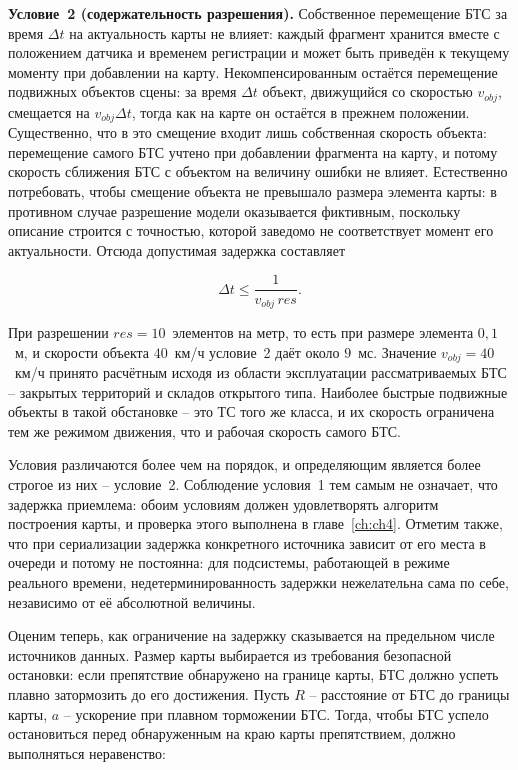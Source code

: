 \textbf{Условие~2 (содержательность разрешения).} Собственное перемещение БТС за время $\Delta t$ на актуальность карты не влияет: каждый фрагмент хранится вместе с положением датчика и временем регистрации и может быть приведён к текущему моменту при добавлении на карту. Некомпенсированным остаётся перемещение подвижных объектов сцены: за время $\Delta t$ объект, движущийся со скоростью $v_{obj}$, смещается на $v_{obj}\Delta t$, тогда как на карте он остаётся в прежнем положении. Существенно, что в это смещение входит лишь собственная скорость объекта: перемещение самого БТС учтено при добавлении фрагмента на карту, и потому скорость сближения БТС с объектом на величину ошибки не влияет. Естественно потребовать, чтобы смещение объекта не превышало размера элемента карты: в противном случае разрешение модели оказывается фиктивным, поскольку описание строится с точностью, которой заведомо не соответствует момент его актуальности. Отсюда допустимая задержка составляет

\begin{equation}
	\Delta t \le \frac{1}{v_{obj}\,res}.
	\label{eq:dt_limit}
\end{equation}

При разрешении $res = 10$~элементов на метр, то есть при размере элемента $0,1$~м, и скорости объекта $40$~км/ч условие~2 даёт около $9$~мс. Значение $v_{obj} = 40$~км/ч принято расчётным исходя из области эксплуатации рассматриваемых БТС -- закрытых территорий и складов открытого типа. Наиболее быстрые подвижные объекты в такой обстановке -- это ТС того же класса, и их скорость ограничена тем же режимом движения, что и рабочая скорость самого БТС.

Условия различаются более чем на порядок, и определяющим является более строгое из них -- условие~2. Соблюдение условия~1 тем самым не означает, что задержка приемлема: обоим условиям должен удовлетворять алгоритм построения карты, и проверка этого выполнена в главе~\cref{ch:ch4}. Отметим также, что при сериализации задержка конкретного источника зависит от его места в очереди и потому не постоянна: для подсистемы, работающей в режиме реального времени, недетерминированность задержки нежелательна сама по себе, независимо от её абсолютной величины.

Оценим теперь, как ограничение на задержку сказывается на предельном числе источников данных. Размер карты выбирается из требования безопасной остановки: если препятствие обнаружено на границе карты, БТС должно успеть плавно затормозить до его достижения. Пусть $R$ -- расстояние от БТС до границы карты, $a$ -- ускорение при плавном торможении БТС. Тогда, чтобы БТС успело остановиться перед обнаруженным на краю карты препятствием, должно выполняться неравенство:

